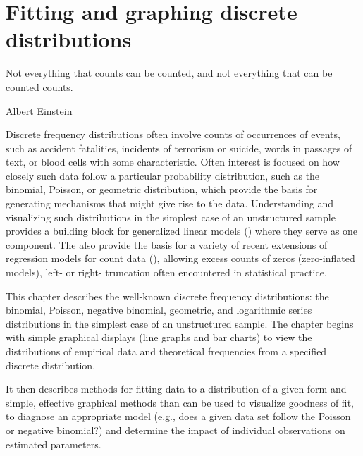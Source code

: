 \documentclass[10pt,krantz2]{krantz}\usepackage[]{graphicx}\usepackage[]{color}
\begin{document}
\chapter{Fitting and graphing discrete distributions}\label{ch:discrete}


\epigraph{Not everything that counts can be counted, and not everything that
can be counted counts.}
{Albert Einstein}

Discrete frequency distributions often involve counts of occurrences of events,
such as accident fatalities, incidents of terrorism or suicide,
words in passages of text, or blood cells with some characteristic.
Often interest is focused on how closely such data follow a particular probability distribution,
such as the binomial, Poisson, or geometric distribution, which
provide the basis for generating mechanisms that might give rise to the
data.
Understanding and visualizing
such distributions
in the simplest case of an unstructured sample provides a building block for generalized
linear models () where they serve as one component.  The also provide the basis for
a variety of recent extensions of regression models for count data (),
allowing excess counts of zeros (zero-inflated models), left- or right-
truncation often encountered in statistical practice.


This chapter describes the well-known discrete
frequency distributions: the binomial, Poisson, negative binomial,
geometric, and logarithmic series distributions in the simplest case of an unstructured sample.
The chapter begins with simple graphical displays (line graphs and bar charts) to view
the distributions of empirical data and theoretical frequencies from a specified
discrete distribution.

It then describes methods for fitting data to a distribution of a given form
and simple, effective
graphical methods than can be used to visualize goodness of fit,
to diagnose an appropriate model (e.g., does a given data set follow the
Poisson or negative binomial?) and determine the impact of
individual observations on estimated parameters.
\end{document}
